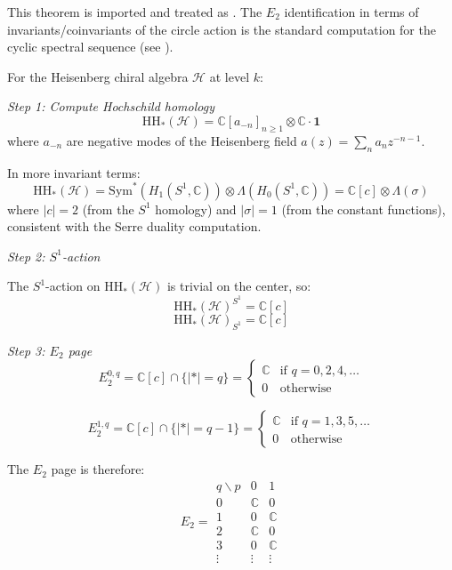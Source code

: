 \begin{remark}
This theorem is imported and treated as \ClaimStatusProvedElsewhere. The $E_2$
identification in terms of invariants/coinvariants of the circle action is the
standard computation for the cyclic spectral sequence (see \cite{Loday98}).
\end{remark}

\begin{example}
\label{ex:E2-heisenberg}
For the Heisenberg chiral algebra $\mathcal{H}$ at level $k$:

\emph{Step 1: Compute Hochschild homology}
\[\text{HH}_*(\mathcal{H}) = \mathbb{C}[a_{-n}]_{n \geq 1} \otimes \mathbb{C} \cdot \mathbf{1}\]
where $a_{-n}$ are negative modes of the Heisenberg field $a(z) = \sum_n a_n z^{-n-1}$.

In more invariant terms:
\[\text{HH}_*(\mathcal{H}) = \text{Sym}^*(H_1(S^1, \mathbb{C})) \otimes \Lambda(H_0(S^1, \mathbb{C})) = \mathbb{C}[c] \otimes \Lambda(\sigma)\]
where $|c| = 2$ (from the $S^1$ homology) and $|\sigma| = 1$ (from the constant functions), consistent with the Serre duality computation.

\emph{Step 2: $S^1$-action}

The $S^1$-action on $\text{HH}_*(\mathcal{H})$ is trivial on the center, so:
\[\text{HH}_*(\mathcal{H})^{S^1} = \mathbb{C}[c]\]
\[\text{HH}_*(\mathcal{H})_{S^1} = \mathbb{C}[c]\]

\emph{Step 3: $E_2$ page}
\[E_2^{0,q} = \mathbb{C}[c] \cap \{|*| = q\} = \begin{cases}
\mathbb{C} & \text{if } q = 0, 2, 4, \ldots \\
0 & \text{otherwise}
\end{cases}\]

\[E_2^{1,q} = \mathbb{C}[c] \cap \{|*| = q-1\} = \begin{cases}
\mathbb{C} & \text{if } q = 1, 3, 5, \ldots \\
0 & \text{otherwise}
\end{cases}\]

The $E_2$ page is therefore:
\[E_2 = \begin{array}{c|cc}
q \backslash p & 0 & 1 \\
\hline
0 & \mathbb{C} & 0 \\
1 & 0 & \mathbb{C} \\
2 & \mathbb{C} & 0 \\
3 & 0 & \mathbb{C} \\
\vdots & \vdots & \vdots
\end{array}\]


\end{example}
